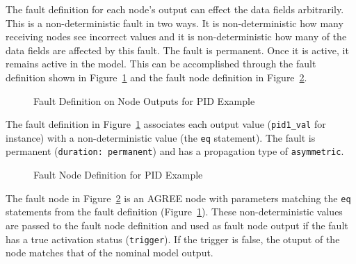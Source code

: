 The fault definition for %
each node's output can effect the data fields arbitrarily. This is a non-deterministic fault in two ways. It is non-deterministic how many receiving nodes see incorrect values and it is non-deterministic how many of the data fields are affected by this fault. The fault is permanent. Once it is active, it remains active in the model. This can be accomplished through the fault definition shown in Figure~\ref{fig:PIDFaultNode} and the fault node definition in Figure~\ref{fig:PIDFaultDef}. 

\begin{figure}[!htb]
        \caption{\label{fig:PIDFaultNode} Fault Definition on Node Outputs for PID Example}
\end{figure}

The fault definition in Figure~\ref{fig:PIDFaultNode} associates each output value (\texttt{pid1\_val} for instance) with a non-deterministic value (the \texttt{eq} statement). The fault is permanent (\texttt{duration: permanent}) and has a propagation type of \texttt{asymmetric}. 

\begin{figure}[!htb]
        \caption{\label{fig:PIDFaultDef} Fault Node Definition for PID Example}
\end{figure}

The fault node in Figure~\ref{fig:PIDFaultDef} is an AGREE node with parameters matching the \texttt{eq} statements from the fault definition (Figure~\ref{fig:PIDFaultNode}). These non-deterministic values are passed to the fault node definition and used as fault node output if the fault has a true activation status (\texttt{trigger}). If the trigger is false, the otuput of the node matches that of the nominal model output. 

